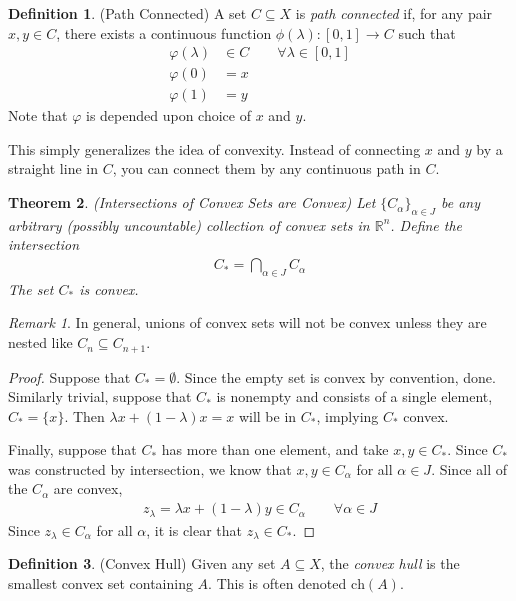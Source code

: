 \documentclass[12pt]{article}
\numberwithin{equation}{section} %
\theoremstyle{plain}
\newtheorem{thm}{Theorem}[section]
\theoremstyle{definition}
\newtheorem{defn}[thm]{Definition}
\theoremstyle{remark}
\newtheorem*{rmk}{Remark}
\newcommand{\ch}{\text{ch}}
\newcommand{\Rn}{\mathbb{R}^n}
\begin{document}
\begin{defn}{(Path Connected)}
A set $C\subseteq X$ is \emph{path connected} if, for any pair $x,y\in
C$, there exists a continuous function $\phi(\lambda):[0,1]\rightarrow
C$ such that
\begin{align*}
  \varphi(\lambda) &\in C \qquad \forall \lambda \in [0,1]\\
  \varphi(0) &= x\\
  \varphi(1) &= y
\end{align*}
Note that $\varphi$ is depended upon choice of $x$ and $y$.

This simply generalizes the idea of convexity. Instead of connecting $x$
and $y$ by a straight line in $C$, you can connect them by any
continuous path in $C$.
\end{defn}

\begin{thm}{\emph{(Intersections of Convex Sets are Convex)}}
Let $\{C_\alpha\}_{\alpha \in J}$ be any arbitrary (possibly
uncountable) collection of convex sets in $\Rn$. Define the intersection
\begin{align*}
  C_* = \bigcap_{\alpha \in J} C_\alpha
\end{align*}
The set $C_*$ is convex.
\end{thm}
\begin{rmk}
In general, unions of convex sets will not be convex unless they are
nested like $C_n \subseteq C_{n+1}$.
\end{rmk}

\begin{proof}
Suppose that $C_* = \emptyset$. Since the empty set is convex by
convention, done. Similarly trivial, suppose that $C_*$ is nonempty and
consists of a single element, $C_* = \{x\}$. Then $\lambda x +
(1-\lambda) x = x$ will be in $C_*$, implying $C_*$ convex.

Finally, suppose that $C_*$ has more than one element, and take $x,y\in
C_*$. Since $C_*$ was constructed by intersection, we know that
$x,y\in C_\alpha$ for all $\alpha \in J$. Since all of the $C_\alpha$
are convex,
\begin{align*}
  z_\lambda = \lambda x + (1-\lambda)y \in C_\alpha
  \qquad \forall \alpha \in J
\end{align*}
Since $z_\lambda \in C_\alpha$ for all $\alpha$, it is clear that
$z_\lambda \in C_*$.
\end{proof}

\begin{defn}{(Convex Hull)}
Given any set $A\subseteq X$, the \emph{convex hull} is the smallest
convex set containing $A$. This is often denoted $\ch(A)$.
\end{defn}
\end{document}
